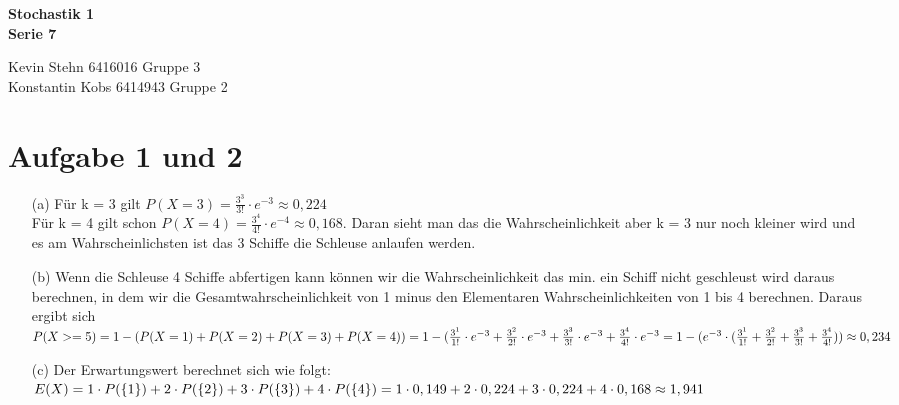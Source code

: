 \documentclass[10pt,a4paper]{article}
\begin{document}
\begin{center}
\textbf{Stochastik 1 \\ Serie 7 \\}
\end{center}

\begin{flushright}
Kevin Stehn 6416016 Gruppe 3 \\
Konstantin Kobs 6414943 Gruppe 2
\end{flushright}

\section*{Aufgabe 1 und 2}
\begin{itemize}
\item[(a)] Für k = 3 gilt $P(X=3) = \frac{3^3}{3!}\cdot e^{-3} \approx 0,224$ \\
Für k = 4 gilt schon $P(X=4) = \frac{3^4}{4!}\cdot e^{-4} \approx 0,168$. Daran sieht man das die Wahrscheinlichkeit aber k = 3 nur noch kleiner wird und es am Wahrscheinlichsten ist das 3 Schiffe die Schleuse anlaufen werden.
\item[(b)] Wenn die Schleuse 4 Schiffe abfertigen kann können wir die Wahrscheinlichkeit das min. ein Schiff nicht geschleust wird daraus berechnen, in dem wir die Gesamtwahrscheinlichkeit von 1 minus den Elementaren Wahrscheinlichkeiten von 1 bis 4 berechnen. Daraus ergibt sich\\
$P(X>=5) = 1- ( P(X=1)+ P(X=2)+P(X=3)+P(X=4))\newline
= 1- (\frac{3^1}{1!}\cdot e^{-3} + \frac{3^2}{2!}\cdot e^{-3} +\frac{3^3}{3!}\cdot e^{-3} + \frac{3^4}{4!}\cdot e^{-3} \newline
= 1-(e^{-3} \cdot (\frac{3^1}{1!} +\frac{3^2}{2!} +\frac{3^3}{3!} +\frac{3^4}{4!}))\approx 0,234$
\item[(c)] Der Erwartungswert berechnet sich wie folgt:\\
$E(X)= 1\cdot P(\{1\})+2\cdot P(\{2\})+3\cdot P(\{3\})+4\cdot P(\{4\}) \newline
= 1\cdot 0,149 + 2\cdot 0,224+3\cdot 0,224+4\cdot 0,168 \approx 1,941$
\end{itemize}
\end{document}
